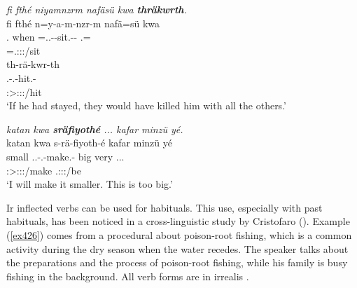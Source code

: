 \begin{exe}
	\ex \emph{fi fthé niyamnzrm nafäsü kwa \textbf{thräkwrth}.}\\
	\glll fi fthé n=y-a-m-nzr-m nafä=sü kwa\\
	\Third.\Abs{} when \Immpst=\Tsg.\Masc.\Alph-\Vc-sit.\Ext-\Ndu-\Dur{} \Third\Assoc.\Pl=\Etc{} \Fut{}\\
	{} {} \footnotesize{\Immpst=\Tsg.\Masc:\Sbj:\Nonpast:\Dur/sit} {} {}\\
	\sn
	\glll th-rä-kwr-th\\
	\Stsg.\Bet-\Irr.\Ndu-hit.\Rs-\Stnsg{}\\
	\footnotesize{\Stpl:\Sbj>\Stpl:\Obj:\Irr:\Pfv/hit}\\
	\trans `If he had stayed, they would have killed him with all the others.'\\ 
	\label{ex381}
\end{exe}
\begin{exe}
	\ex \emph{katan kwa \textbf{sräfiyothé} ... kafar minzü yé.}\\
	\glll katan kwa s-rä-fiyoth-é kafar minzü yé\\
	small \Fut{} \Tsg.\Masc.\Bet-\Vc.\Ndu-make.\Rs-\Fsg{} big very \Tsg.\Masc.\Cop.\Ndu{}\\
	{} {} \footnotesize{\Fsg:\Sbj>\Tsg:\Obj:\Irr:\Pfv/make} {} {} {} \footnotesize{\Tsg.\Masc:\Sbj:\Nonpast:\Ipfv/be}\\
	\trans `I will make it smaller. This is too big.' 
	\label{ex382}
\end{exe}

Ir inflected verbs can be used for habituals. This use, especially with past habituals, has been noticed in a cross-linguistic study by Cristofaro (\citeyear{Cristofaro:2004wi}). Example (\ref{ex426}) comes from a procedural about poison-root fishing, which is a common activity during the dry season when the water recedes. The speaker talks about the preparations and the process of poison-root fishing, while his family is busy fishing in the background. All verb forms are in irrealis .

